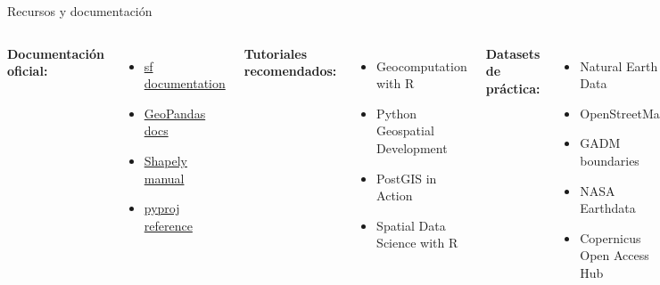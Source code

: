 \documentclass[10pt,aspectratio=169]{beamer}
\begin{document}
\begin{frame}{Recursos y documentación}
    \begin{columns}[T]
        \textbf{Documentación oficial:}
        \begin{itemize}
            \item \href{https://r-spatial.github.io/sf/}{sf documentation}
            \item \href{https://geopandas.org}{GeoPandas docs}
            \item \href{https://shapely.readthedocs.io}{Shapely manual}
            \item \href{https://pyproj4.github.io/pyproj/}{pyproj reference}
        \end{itemize}
        
        \vspace{0.3cm}
        
        \textbf{Tutoriales recomendados:}
        \begin{itemize}
            \item Geocomputation with R
            \item Python Geospatial Development
            \item PostGIS in Action
            \item Spatial Data Science with R
        \end{itemize}
        
        \textbf{Datasets de práctica:}
        \begin{itemize}
            \item Natural Earth Data
            \item OpenStreetMap
            \item GADM boundaries
            \item NASA Earthdata
            \item Copernicus Open Access Hub
        \end{itemize}
        
        \vspace{0.3cm}
        
        \textbf{Comunidades:}
        \begin{itemize}
            \item r-spatial GitHub
            \item GeoPandas Discussions
            \item GIS Stack Exchange
            \item OSGeo mailing lists
        \end{itemize}
    \end{columns}
\end{frame}
\end{document}
